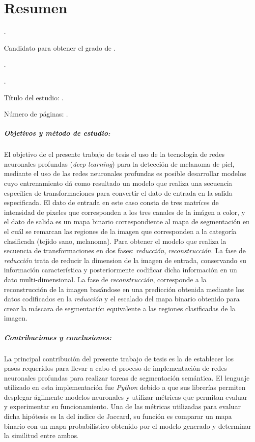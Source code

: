 
\chapter{Resumen}

{\renewcommand{\baselinestretch}{1.1}\selectfont
{\setlength{\leftskip}{10mm}
\setlength{\parindent}{-10mm}

\autor.

Candidato para obtener el grado de \grado\orientacion.

\uanl.

\fime.

Título del estudio: \textsc{\titulo}.

\noindent Número de páginas: \pageref*{lastpage}.}

\paragraph{Objetivos y método de estudio:}
El objetivo de el presente trabajo de tesis el uso de la tecnología de redes neuronales profundas (\emph{deep learning}) para la detección de melanoma de piel, mediante el uso de las redes neuronales profundas es posible desarrollar modelos cuyo entrenamiento dá como resultado un modelo que realiza una secuencia específica de transformaciones para convertir el dato de entrada en la salida especificada. El dato de entrada en este caso consta de tres matríces de intensidad de pixeles que corresponden a los tres canales de la imágen a color, y el dato de salida es un mapa binario correspondiente al mapa de segmentación en el cuál se remarcan las regiones de la imagen que corresponden a la categoría clasificada (tejido sano, melanoma). Para obtener el modelo que realiza la secuencia de transformaciones en dos fases: \emph{reducción}, \emph{reconstrucción}. La fase de \emph{reducción} trata de reducir la dimension de la imagen de entrada, conservando su información característica y posteriormente codificar dicha información en un dato multi-dimensional. La fase de \emph{reconstrucción}, corresponde a la reconstrucción de la imagen basándose en una predicción obtenida mediante los datos codificados en la \emph{reducción} y el escalado del mapa binario obtenido para crear la máscara de segmentación equivalente a las regiones clasificadas de la imagen.

\paragraph{Contribuciones y conclusiones:}
La principal contribución del presente trabajo de tesis es la de establecer los pasos requeridos para llevar a cabo el proceso de implementación de redes neuronales profundas para realizar tareas de segmentación semántica. El lenguaje utilizado en esta implementación fue \emph{Python} debido a que sus librerías permiten desplegar ágilmente modelos neuronales y utilizar métricas que permitan evaluar y experimentar su funcionamiento. Una de las métricas utilizadas para evaluar dicha hipótesis es la del índice de Jaccard, su función es comparar un mapa binario con un mapa probabilístico obtenido por el modelo generado y determinar la similitud entre ambos. 

}
